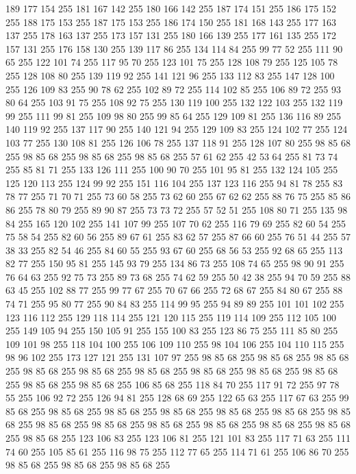 189 177 154 255 181 167 142 255 180 166 142 255 187 174 151 255 186 175 152 255 188 175 153 255 187 175 153 255 186 174 150 255 181 168 143 255 177 163 137 255 178 163 137 255 173 157 131 255 180 166 139 255 177 161 135 255 172 157 131 255 176 158 130 255 139 117 86 255 134 114 84 255 99 77 52 255 111 90 65 255 122 101 74 255 117 95 70 255 123 101 75 255 128 108 79 255 125 105 78 255 128 108 80 255 139 119 92 255 141 121 96 255 133 112 83 255 147 128 100 255 126 109 83 255 90 78 62 255 102 89 72 255 114 102 85 255 106 89 72 255 93 80 64 255 103 91 75 255 108 92 75 255 130 119 100 255 132 122 103 255 132 119 99 255 111 99 81 255 109 98 80 255 99 85 64 255 129 109 81 255 136 116 89 255 140 119 92 255 137 117 90 255 140 121 94 255 129 109 83 255 124 102 77 255 124 103 77 255 130 108 81 255 126 106 78 255 137 118 91 255 128 107 80 255 98 85 68 255 98 85 68 255 98 85 68 255 98 85 68 255 57 61 62 255 42 53 64 255 81 73 74 255 85 81 71 255
133 126 111 255 100 90 70 255 101 95 81 255 132 124 105 255 125 120 113 255 124 99 92 255 151 116 104 255 137 123 116 255 94 81 78 255 83 78 77 255 71 70 71 255 73 60 58 255 73 62 60 255 67 62 62 255 88 76 75 255 85 86 86 255 78 80 79 255 89 90 87 255 73 73 72 255 57 52 51 255 108 80 71 255 135 98 84 255 165 120 102 255 141 107 99 255 107 70 62 255 116 79 69 255 82 60 54 255 75 58 54 255 82 60 56 255 89 67 61 255 83 62 57 255 87 66 60 255 76 51 44 255 57 38 33 255 82 54 46 255 84 60 55 255 93 67 60 255 68 56 53 255 92 68 65 255 113 82 77 255 150 95 81 255 145 93 79 255 134 86 73 255 108 74 65 255 98 90 91 255 76 64 63 255 92 75 73 255 89 73 68 255 74 62 59 255 50 42 38 255 94 70 59 255 88 63 45 255 102 88 77 255 99 77 67 255 70 67 66 255 72 68 67 255 84 80 67 255 88 74 71 255 95 80 77 255 90 84 83 255 114 99 95 255 94 89 89 255 101 101 102 255 123 116 112 255
129 118 114 255 121 120 115 255 119 114 109 255 112 105 100 255 149 105 94 255 150 105 91 255 155 100 83 255 123 86 75 255 111 85 80 255 109 101 98 255 118 104 100 255 106 109 110 255 98 104 106 255 104 110 115 255 98 96 102 255 173 127 121 255 131 107 97 255 98 85 68 255 98 85 68 255 98 85 68 255 98 85 68 255 98 85 68 255 98 85 68 255 98 85 68 255 98 85 68 255 98 85 68 255 98 85 68 255 98 85 68 255 106 85 68 255 118 84 70 255 117 91 72 255 97 78 55 255 106 92 72 255 126 94 81 255 128 68 69 255 122 65 63 255 117 67 63 255 99 85 68 255 98 85 68 255 98 85 68 255 98 85 68 255 98 85 68 255 98 85 68 255 98 85 68 255 98 85 68 255 98 85 68 255 98 85 68 255 98 85 68 255 98 85 68 255 98 85 68 255 98 85 68 255 123 106 83 255 123 106 81 255 121 101 83 255 117 71 63 255 111 74 60 255 105 85 61 255 116 98 75 255 112 77 65 255 114 71 61 255 106 86 70 255 98 85 68 255 98 85 68 255 98 85 68 255
